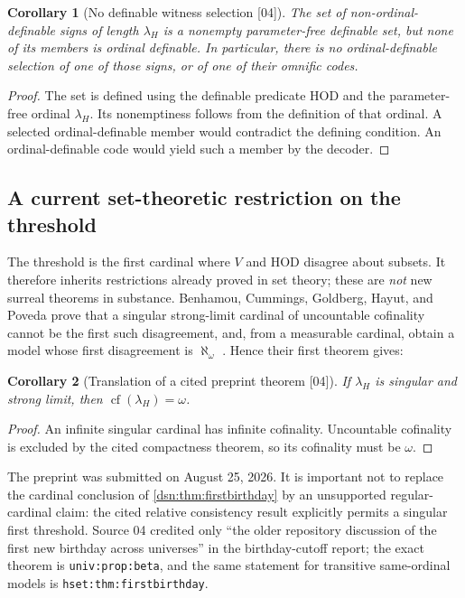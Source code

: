 \documentclass[11pt,a4paper]{article}
\numberwithin{equation}{section}
\newtheorem{corollary}[corollary]{Corollary}
\theoremstyle{definition}
\theoremstyle{remark}
\newcommand{\HOD}{\mathrm{HOD}}
\newcommand{\src}[1]{\textup{\textsf{\small[#1]}}}
\newcommand{\lbl}[1]{\nolinkurl{#1}}
\begin{document}
\begin{corollary}[No definable witness selection \src{04}]
The set of non-ordinal-definable signs of length $\lambda_H$ is a
nonempty parameter-free definable set, but none of its members is
ordinal definable. In particular, there is no ordinal-definable
selection of one of those signs, or of one of their omnific codes.
\end{corollary}
\begin{proof}
The set is defined using the definable predicate $\HOD$ and the
parameter-free ordinal $\lambda_H$. Its nonemptiness follows from
the definition of that ordinal. A selected ordinal-definable member
would contradict the defining condition. An ordinal-definable code
would yield such a member by the decoder.
\end{proof}

\subsection{A current set-theoretic restriction on the threshold}

The threshold is the first cardinal where $V$ and $\HOD$ disagree about
subsets. It therefore inherits restrictions already proved in set
theory; these are \emph{not} new surreal theorems in substance.
Benhamou, Cummings, Goldberg, Hayut, and Poveda prove that a singular
strong-limit cardinal of uncountable cofinality cannot be the first
such disagreement, and, from a measurable cardinal, obtain a model
whose first disagreement is $\aleph_\omega$
\cite{BCHGP2026}. Hence their first theorem gives:

\begin{corollary}[Translation of a cited preprint theorem \src{04}]
If $\lambda_H$ is singular and strong limit, then
$\operatorname{cf}(\lambda_H)=\omega$.
\end{corollary}
\begin{proof}
An infinite singular cardinal has infinite cofinality. Uncountable
cofinality is excluded by the cited compactness theorem, so its
cofinality must be $\omega$.
\end{proof}

The preprint was submitted on August 25, 2026. It is important not to
replace the cardinal conclusion of \cref{dsn:thm:firstbirthday}
by an unsupported regular-cardinal claim: the cited relative
consistency result explicitly permits a singular first threshold.
Source 04 credited only ``the older repository discussion of the first new
birthday across universes'' in the birthday-cutoff report; the exact
theorem is \lbl{univ:prop:beta}, and the same statement for transitive
same-ordinal models is \lbl{hset:thm:firstbirthday}.
\end{document}

